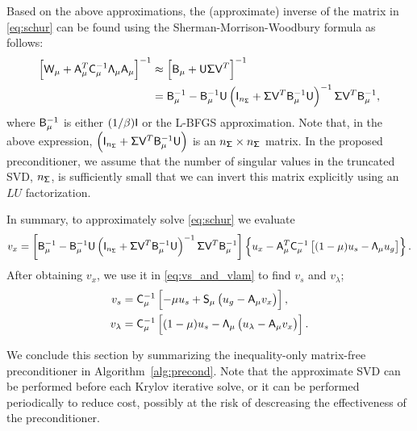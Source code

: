 Based on the above approximations, the (approximate) inverse of the matrix in
\eqref{eq:schur} can be found using the Sherman-Morrison-Woodbury formula as follows:
\begin{align}
\left[\mathsf{W}_\mu + \mathsf{A}_\mu^T \mathsf{C}_\mu^{-1}  \mathsf{\Lambda}_\mu  \mathsf{A}_\mu \right]^{-1}
&\approx
\left[\mathsf{B}_{\mu} + \mathsf{U} \mathsf{\Sigma} \mathsf{V}^T \right]^{-1} \notag \\
&= \mathsf{B}_\mu^{-1} - \mathsf{B}_\mu^{-1} \mathsf{U}  \left(  \mathsf{I}_{n_{\mathsf{\Sigma}}} +  \mathsf{\Sigma} \mathsf{V}^{T} \mathsf{B}_\mu^{-1} 
\mathsf{U} \right)^{-1} \mathsf{\Sigma} \mathsf{V}^{T} \mathsf{B}_\mu^{-1},
\label{eq:smw}
\end{align}
where $\mathsf{B}_\mu^{-1}$ is either $(1/\beta)\mathsf{I}$ or the L-BFGS
approximation.  Note that, in the above expression, $\left(\mathsf{I}_{n_{\mathsf{\Sigma}}} +
\mathsf{\Sigma} \mathsf{V}^{T} \mathsf{B}_{\mu}^{-1} \mathsf{U} \right)$ is an $n_{\mathsf{\Sigma}}\times
n_{\mathsf{\Sigma}}$ matrix.  In the proposed preconditioner, we assume that the number of
singular values in the truncated SVD, \ie $n_{\mathsf{\Sigma}}$, is sufficiently small that we
can invert this matrix explicitly using an $LU$ factorization.

In summary, to approximately solve \eqref{eq:schur} we evaluate
\begin{equation}\label{eq:vx}
  v_x = \left[\mathsf{B}_\mu^{-1} - \mathsf{B}_\mu^{-1} \mathsf{U}  \left(  \mathsf{I}_{n_{\mathsf{\Sigma}}} +  \mathsf{\Sigma} \mathsf{V}^{T} 
  \mathsf{B}_\mu^{-1} \mathsf{U} \right)^{-1} \mathsf{\Sigma} \mathsf{V}^{T} \mathsf{B}_\mu^{-1} \right]
  \left\{ u_x - \mathsf{A}_\mu^T \mathsf{C}_{\mu}^{-1} \left[(1-\mu) u_s -
  \mathsf{\Lambda}_\mu u_g \right]\right\}.
\end{equation}
After obtaining $v_x$, we use it in \eqref{eq:vs_and_vlam} to
find $v_s$ and $v_\lambda$;
\begin{align}
  v_s &= \mathsf{C}_\mu^{-1}\left[-\mu u_s + \mathsf{S}_\mu \left( u_g - \mathsf{A}_\mu v_x\right) \right], \label{eq:vs} \\
  v_\lambda &= \mathsf{C}_\mu^{-1}\left[(1-\mu)u_s - \mathsf{\Lambda}_\mu \left( u_\lambda - \mathsf{A}_\mu v_x \right) \right]. 
  \label{eq:vlam}
\end{align}


We conclude this section by summarizing the inequality-only matrix-free preconditioner
in Algorithm~\ref{alg:precond}.  Note that the approximate SVD can be performed
before each Krylov iterative solve, or it can be performed periodically to
reduce cost, possibly at the risk of descreasing the effectiveness of the
preconditioner.

